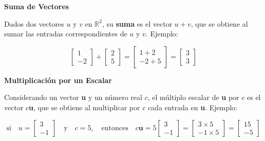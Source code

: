 \documentclass{article}
\begin{document}
\begin{large}
    \textbf{Suma de Vectores}
\end{large}

Dados dos vectores $u$ y $v$ en $\mathbb{R}^2$, su \textbf{suma} es el vector $u + v$, que se obtiene al sumar las entradas correspondientes de $u$ y $v$. Ejemplo:

\begin{equation*}
    \begin{bmatrix}
        1\\
        -2
    \end{bmatrix}
    + \begin{bmatrix}
        2\\
        5
    \end{bmatrix}
    = \begin{bmatrix}
        1 + 2 \\
        -2 + 5
    \end{bmatrix}
    = \begin{bmatrix}
        3 \\
        3
    \end{bmatrix}
\end{equation*}

\begin{large}
    \textbf{Multiplicación por un Escalar}
\end{large}

Considerando un vector \textbf{u} y un número real $c$, el múltiplo escalar de \textbf{u} por $c$ es el vector $c$\textbf{u}, que se obtiene al multiplicar por $c$ cada entrada en \textbf{u}. Ejemplo:

\begin{equation*}
    \text{si} \quad u = \begin{bmatrix}
        3\\
        -1
    \end{bmatrix} 
    \quad \text{y} \quad c = 5, \quad \text{entonces} \quad
    c \textbf{u} = 5 \begin{bmatrix}
        3\\
        -1
    \end{bmatrix}
    = \begin{bmatrix}
        3 \times 5 \\
        -1 \times 5
    \end{bmatrix}
    = \begin{bmatrix}
        15 \\
        -5
    \end{bmatrix}
\end{equation*}
\end{document}
